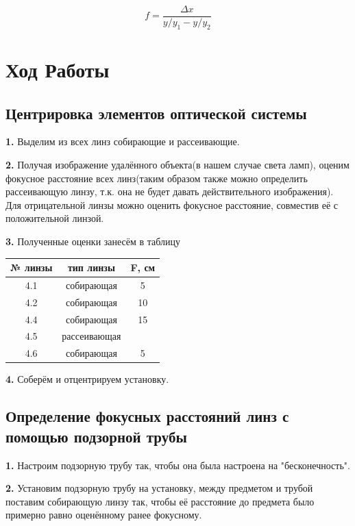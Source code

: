 \documentclass[a4paper,12pt]{article}
\begin{document}
\begin{equation}
    f = \frac{\Delta x}{y / y_1 - y / y_2}    
\end{equation}

\newpage
\section{Ход Работы}
\subsection*{Центрировка элементов оптической системы}
\textbf{1.} Выделим из всех линз собирающие и рассеивающие. 

\textbf{2.} Получая изображение удалённого объекта(в нашем случае света ламп), оценим фокусное расстояние всех линз(таким образом также можно определить рассеивающую линзу, т.к. она не будет давать действительного изображения). Для отрицательной линзы можно оценить фокусное расстояние, совместив её с положительной линзой. 

\textbf{3.} Полученные оценки занесём в таблицу

\begin{table}[H]
\centering
	\begin{tabular}{|c|c|c|}
	\hline
	№ линзы & тип линзы & F, см \\ \hline
	4.1 & собирающая & 5 \\ \hline
	4.2 & собирающая & 10 \\ \hline
	4.4 & собирающая & 15 \\ \hline
	4.5 & рассеивающая &  \\ \hline
	4.6 & собирающая & 5 \\ \hline
	\end{tabular}
\end{table}

\textbf{4.} Соберём и отцентрируем установку.

\subsection*{Определение фокусных расстояний линз с помощью подзорной трубы}
\textbf{1.} Настроим подзорную трубу так, чтобы она была настроена на "бесконечность".

\textbf{2.} Установим подзорную трубу на установку, между предметом и трубой поставим собирающую линзу так, чтобы её расстояние до предмета было примерно равно оценённому ранее фокусному.
\end{document}
